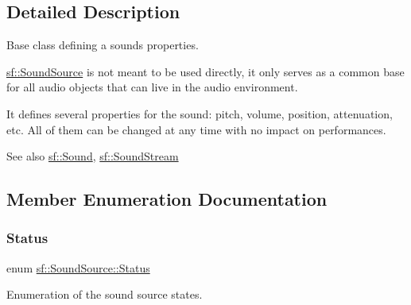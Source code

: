 \subsection{Detailed Description}
Base class defining a sound\textquotesingle{}s properties. 

\hyperlink{classsf_1_1_sound_source}{sf\+::\+Sound\+Source} is not meant to be used directly, it only serves as a common base for all audio objects that can live in the audio environment.

It defines several properties for the sound\+: pitch, volume, position, attenuation, etc. All of them can be changed at any time with no impact on performances.

\begin{DoxySeeAlso}{See also}
\hyperlink{classsf_1_1_sound}{sf\+::\+Sound}, \hyperlink{classsf_1_1_sound_stream}{sf\+::\+Sound\+Stream} 
\end{DoxySeeAlso}


\subsection{Member Enumeration Documentation}
\mbox{\label{classsf_1_1_sound_source_ac43af72c98c077500b239bc75b812f03}} 
\subsubsection{\texorpdfstring{Status}{Status}}
{\footnotesize\ttfamily enum \hyperlink{classsf_1_1_sound_source_ac43af72c98c077500b239bc75b812f03}{sf\+::\+Sound\+Source\+::\+Status}}



Enumeration of the sound source states. 

